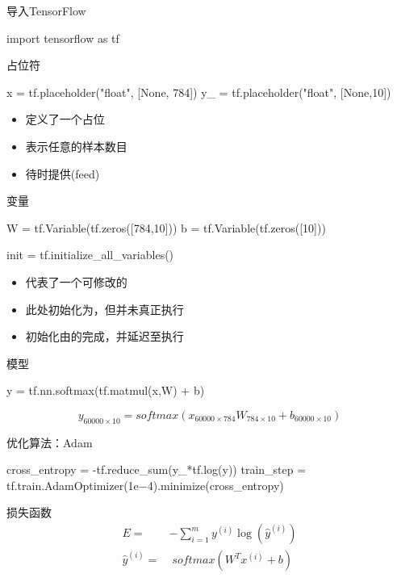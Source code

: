 \begin{frame}[fragile]{导入TensorFlow}
\begin{python}
import tensorflow as tf
\end{python}
\end{frame}

\begin{frame}[fragile]{占位符}
\begin{python}
x  = tf.placeholder("float", [None, 784])  
y_ = tf.placeholder("float", [None,10])
\end{python}

\begin{itemize}
  \item {}定义了一个占位
  \item {}表示任意的样本数目
  \item 待时提供(feed)
\end{itemize}
\end{frame}

\begin{frame}[fragile]{变量}
\begin{python}
W = tf.Variable(tf.zeros([784,10]))
b = tf.Variable(tf.zeros([10]))

init = tf.initialize_all_variables()
\end{python}

\begin{itemize}
  \item {}代表了一个可修改的
  \item 此处初始化为，但并未真正执行
  \item 初始化由的完成，并延迟至执行
\end{itemize}

\end{frame}

\begin{frame}[fragile]{模型}
\begin{python}
y = tf.nn.softmax(tf.matmul(x,W) + b)
\end{python}

\[{y_{60000 \times 10}} = softmax ({x_{60000 \times 784}}{W_{784 \times 10}} + {b_{60000 \times 10}})\]

\end{frame}

\begin{frame}[fragile]{优化算法：Adam}
\begin{python}
cross_entropy = -tf.reduce_sum(y_*tf.log(y))
train_step = tf.train.AdamOptimizer(1e−4).minimize(cross_entropy)
\end{python}

\begin{block}{损失函数}
\[\begin{aligned}
  E =  & - \sum\limits_{i = 1}^m {{y^{(i)}}\log } \left( {{{\widehat y}^{(i)}}} \right) \\ 
  {\widehat y^{(i)}} =  & \; softmax ({W^T}{x^{(i)}} + b) \\ 
\end{aligned} \]
\end{block}
\end{frame}

